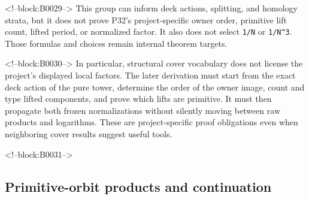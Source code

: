 \documentclass[11pt]{article}
\begin{document}
<!--block:B0029-->
This group can inform deck actions, splitting, and homology strata, but
it does not prove P32's project-specific owner order, primitive lift
count, lifted period, or normalized factor. It also does not select
\texttt{1/N} or \texttt{1/N\^{}3}. Those formulas and choices remain
internal theorem targets.

<!--block:B0030-->
In particular, structural cover vocabulary does not license the
project's displayed local factors. The later derivation must start from
the exact deck action of the pure tower, determine the order of the
owner image, count and type lifted components, and prove which lifts are
primitive. It must then propagate both frozen normalizations without
silently moving between raw products and logarithms. These are
project-specific proof obligations even when neighboring cover results
suggest useful tools.

<!--block:B0031-->
\hypertarget{23-primitive-orbit-products-and-continuation}{%
\subsection{Primitive-orbit products and
continuation}\label{23-primitive-orbit-products-and-continuation}}
\end{document}
